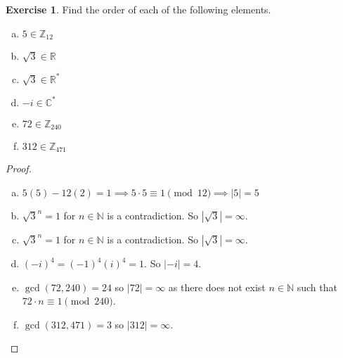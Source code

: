 \documentclass{article}
\theoremstyle{definition}
\newtheorem{theorem}{Exercise}[section]
\newcommand{\R}{\mathbb{R}}
\newcommand{\Z}{\mathbb{Z}}
\newcommand{\N}{\mathbb{N}}
\begin{document}
	\begin{theorem}
		Find the order of each of the following elements.
		\begin{multicols}{3}
			\begin{enumerate}[(a)]
			\item $5\in\Z_12$
			\item $\sqrt{3}\in\R$
			\item $\sqrt{3}\in\R^*$
			\item $-i\in\mathbb{C}^*$
			\item $72\in\Z_{240}$
			\item $312\in\Z_{471}$
		\end{enumerate}
		\end{multicols}
	\end{theorem}
	\begin{proof}
		\begin{enumerate}[(a)]
			\item $5(5)-12(2)=1\implies 5\cdot 5\equiv 1\pmod{12}\implies|5|=5$
			\item $\sqrt{3}^n=1$ for $n\in\N$ is a contradiction. So $|\sqrt{3}|=\infty$. 
			\item $\sqrt{3}^n=1$ for $n\in\N$ is a contradiction. So $|\sqrt{3}|=\infty$. 
			\item $\left(-i\right)^4=\left(-1\right)^4\left(i\right)^4=1$. So $|-i|=4$. 
			\item $\gcd\left(72,240\right)=24$ so $|72|=\infty$ as there does not exist $n\in\N$ such that $72\cdot n\equiv1\pmod{240}$. 
			\item $\gcd\left(312,471\right)=3$ so $|312|=\infty$. 
		\end{enumerate}
	\end{proof}
\end{document}
